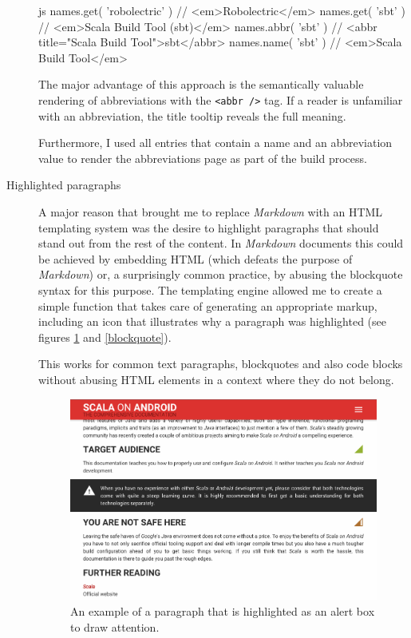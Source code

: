 \begin{description}
	\begin{code}{js}
names.get( 'robolectric' ) // <em>Robolectric</em>
names.get( 'sbt' ) // <em>Scala Build Tool (sbt)</em>
names.abbr( 'sbt' ) // <abbr title="Scala Build Tool">sbt</abbr>
names.name( 'sbt' ) // <em>Scala Build Tool</em>
	\end{code}

	The major advantage of this approach is the semantically valuable rendering of abbreviations with the \texttt{<abbr />} tag. If a reader is unfamiliar with an abbreviation, the title tooltip reveals the full meaning.

	Furthermore, I used all entries that contain a name and an abbreviation value to render the abbreviations page as part of the build process.

	\item[Highlighted paragraphs]\hfill

	A major reason that brought me to replace \textit{Markdown} with an \ac{HTML} templating system was the desire to highlight paragraphs that should stand out from the rest of the content. In \textit{Markdown} documents this could be achieved by embedding \ac{HTML} (which defeats the purpose of \textit{Markdown}) or, a surprisingly common practice, by abusing the blockquote syntax for this purpose. The templating engine allowed me to create a simple function that takes care of generating an appropriate markup, including an icon that illustrates why a paragraph was highlighted (see figures \ref{alert} and \ref{blockquote}).

	\begin{code}{html}
{%
	<p>Lorem Ipsum</p>
{%
	\end{code}

	This works for common text paragraphs, blockquotes and also code blocks without abusing \ac{HTML} elements in a context where they do not belong.

	\begin{figure}[]
		\includegraphics[width=\textwidth]{asset/alert.png}
		\caption{An example of a paragraph that is highlighted as an alert box to draw attention.}
		\label{alert}
	\end{figure}


\end{description}
